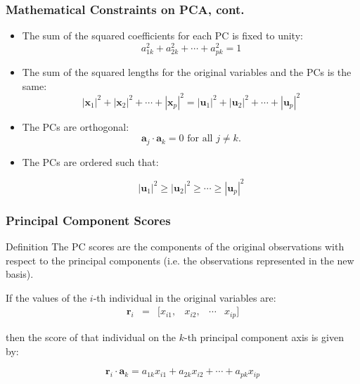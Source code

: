 \documentclass{beamer}
\newcommand{\Mtx}[1]{\ensuremath{\mathbf{#1}}}
\begin{document}
\begin{frame}
  \frametitle{Mathematical Constraints on PCA, cont.}


\begin{itemize}
	\item The sum of the squared coefficients for each PC is fixed to unity:
\[
a_{1k}^2 + a_{2k}^2 + \cdots + a_{pk}^2 = 1
\]

	\item The sum of the squared lengths for the original variables and the PCs is the same:
\[
|\Mtx{x}_1|^2 + |\Mtx{x}_2|^2 + \cdots + |\Mtx{x}_p|^2 = |\Mtx{u}_1|^2 + |\Mtx{u}_2|^2 + \cdots + |\Mtx{u}_p|^2
\]	

	\item The PCs are orthogonal:
\[
\Mtx{a}_j \cdot \Mtx{a}_k = 0 \mbox{ for all } j \neq k.
\]

	\item The PCs are ordered such that:

\[
 |\Mtx{u}_1|^2 \geq |\Mtx{u}_2|^2  \geq \cdots \geq |\Mtx{u}_p|^2
\]

\end{itemize}

\end{frame}



\begin{frame}
  \frametitle{Principal Component Scores}

\begin{block}{Definition}
The PC scores are the components of the original observations with respect to the principal components (i.e. the observations represented in the new basis).
\end{block}
\medskip

If the values of the $i$-th individual in the original variables are:
\[
\begin{array}{cccccc}
\Mtx{r}_i & = & [x_{i1}, & x_{i2}, & \cdots & x_{ip}]
\end{array}
\]

then the score of that individual on the $k$-th principal component axis is given by:

\[
\Mtx{r}_i \cdot \Mtx{a}_k = a_{1k}x_{i1} + a_{2k}x_{i2} + \cdots + a_{pk}x_{ip}
\]

\end{frame}
\end{document}
